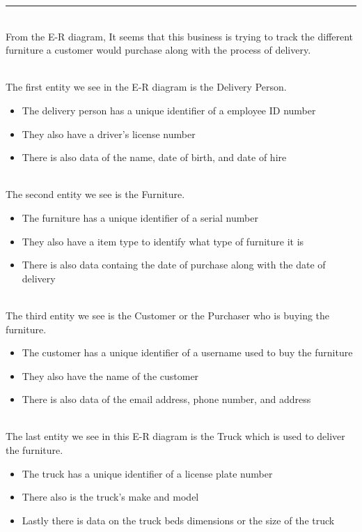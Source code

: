 \documentclass{article}
\begin{document}
\begin{center}
    \noindent\rule{12cm}{0.4pt}
\end{center}

\noindent\\
From the E-R diagram, It seems that this business is trying to track the different furniture a customer would purchase along with the process of delivery.

\noindent\\
The first entity we see in the E-R diagram is the Delivery Person.

\begin{itemize}
    \item The delivery person has a unique identifier of a employee ID number
    \item They also have a driver's license number
    \item There is also data of the name, date of birth, and date of hire
\end{itemize}

\noindent\\
The second entity we see is the Furniture. 

\begin{itemize}
    \item The furniture has a unique identifier of a serial number
    \item They also have a item type to identify what type of furniture it is
    \item There is also data containg the date of purchase along with the date of delivery
\end{itemize}

\noindent\\
The third entity we see is the Customer or the Purchaser who is buying the furniture.

\begin{itemize}
    \item The customer has a unique identifier of a  username used to buy the furniture
    \item They also have the name of the customer
    \item There is also data of the email address, phone number, and address
\end{itemize}

\noindent\\
The last entity we see in this E-R diagram is the Truck which is used to deliver the furniture.

\begin{itemize}
    \item The truck has a unique identifier of a license plate number
    \item There also is the truck's make and model
    \item Lastly there is data on the truck beds dimensions or the size of the truck
\end{itemize}
\end{document}
